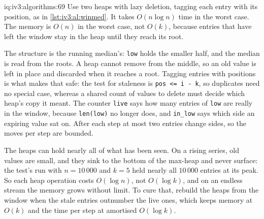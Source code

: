 \begin{solution}{iq:iv3:algorithms:69}
Use two heaps with lazy deletion, tagging each entry with its position, as in \cref{lst:iv3:al:winmed}. It takes $O(n \log n)$ time in the worst case. The memory is $O(n)$ in the worst case, not $O(k)$, because entries that have left the window stay in the heap until they reach its root.
\label{lst:iv3:al:winmed}

The structure is the running median's: \texttt{low} holds the smaller half, and the median is read from the roots. A heap cannot remove from the middle, so an old value is left in place and discarded when it reaches a root. Tagging entries with positions is what makes that safe: the test for staleness is \texttt{pos <= i - k}, so duplicates need no special case, whereas a shared count of values to delete must decide which heap's copy it meant. The counter \texttt{live} says how many entries of \texttt{low} are really in the window, because \texttt{len(low)} no longer does, and \texttt{in\_low} says which side an expiring value sat on. After each step at most two entries change sides, so the moves per step are bounded.

The heaps can hold nearly all of what has been seen. On a rising series, old values are small, and they sink to the bottom of the max-heap and never surface: the test's run with $n = 10\,000$ and $k = 5$ held nearly all $10\,000$ entries at its peak. So each heap operation costs $O(\log n)$, not $O(\log k)$, and on an endless stream the memory grows without limit. To cure that, rebuild the heaps from the window when the stale entries outnumber the live ones, which keeps memory at $O(k)$ and the time per step at amortised $O(\log k)$.

\end{solution}

